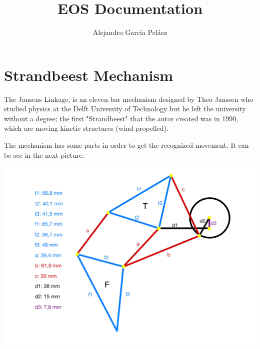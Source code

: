 \documentclass[11pt,a4paper]{article}
\author{Alejandro García Peláez}
\title{EOS Documentation}
\begin{document}
\maketitle 
\break


\vspace*{-3cm}
\section*{Strandbeest Mechanism}

The Jansens Linkage, is an eleven-bar mechanism designed by Theo Janssen who studied physics at the Delft University of Technology but he left the university without a degree; the first "Strandbeest" that the autor created was in 1990, which are moving kinetic structures (wind-propelled).

\noindent\newline The mechanism has some parts in order to get the recognized movement. It can be see in the next picture: \newline \newline

\includegraphics[scale=0.1]{"project_pictures/measures.jpg"}
\end{document}

